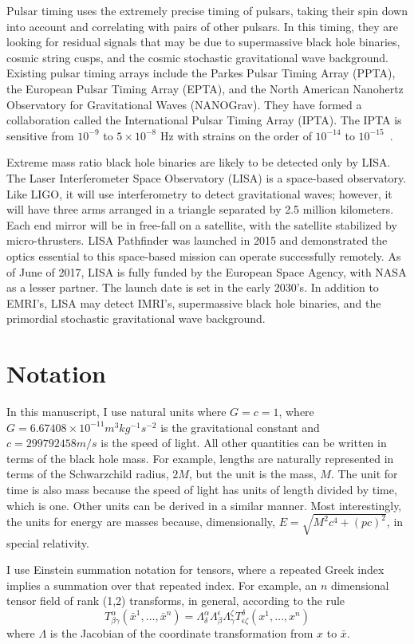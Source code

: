 Pulsar timing uses the extremely precise timing of pulsars, taking their spin down into account and correlating with pairs of other pulsars. In this timing, they are looking for residual signals that may be due to supermassive black hole binaries, cosmic string cusps, and the cosmic stochastic gravitational wave background. Existing pulsar timing arrays include the Parkes Pulsar Timing Array (PPTA), the European Pulsar Timing Array (EPTA), and the North American Nanohertz Observatory for Gravitational Waves (NANOGrav). They have formed a collaboration called the International Pulsar Timing Array (IPTA). The IPTA is sensitive from $10^{-9}$ to $5\times10^{-8}$ Hz with strains on the order of $10^{-14}$ to $10^{-15}$~\cite{hobbs_dai}.



Extreme mass ratio black hole binaries are likely to be detected only by LISA. The Laser Interferometer Space Observatory (LISA) is a space-based observatory. Like LIGO, it will use interferometry to detect gravitational waves; however, it will have three arms arranged in a triangle separated by 2.5 million kilometers. Each end mirror will be in free-fall on a satellite, with the satellite stabilized by micro-thrusters. LISA Pathfinder was launched in 2015 and demonstrated the optics essential to this space-based mission can operate successfully remotely. As of June of 2017, LISA is fully funded by the European Space Agency, with NASA as a lesser partner. The launch date is set in the early 2030's. In addition to EMRI's, LISA may detect IMRI's, supermassive black hole binaries, and the primordial stochastic gravitational wave background.


\section{Notation}
In this manuscript, I use natural units where $G=c=1$, where $G=6.67408\times 10^{-11} m^3kg^{-1}s^{-2}$ is the gravitational constant and $c=299792458 m/s$ is the speed of light. All other quantities can be written in terms of the black hole mass. For example, lengths are naturally represented in terms of the Schwarzchild radius, $2M$, but the unit is the mass, $M$. The unit for time is also mass because the speed of light has units of length divided by time, which is one. Other units can be derived in a similar manner. Most interestingly, the units for energy are masses because, dimensionally, $E=\sqrt{M^2c^4+(pc)^2}$, in special relativity. 

I use Einstein summation notation for tensors, where a repeated Greek index implies a summation over that repeated index. For example, an $n$ dimensional tensor field of rank (1,2) transforms, in general, according to the rule
\begin{equation}
  T^\alpha_{\beta\gamma}(\bar{x}^1,\ldots,\bar{x}^n)=\Lambda^\alpha_\delta\Lambda^\epsilon_\beta\Lambda^\zeta_\gamma T^\delta_{\epsilon\zeta}(x^1,\ldots,x^n)
\end{equation}
where $\Lambda$ is the Jacobian of the coordinate transformation from $x$ to $\bar{x}$. 

